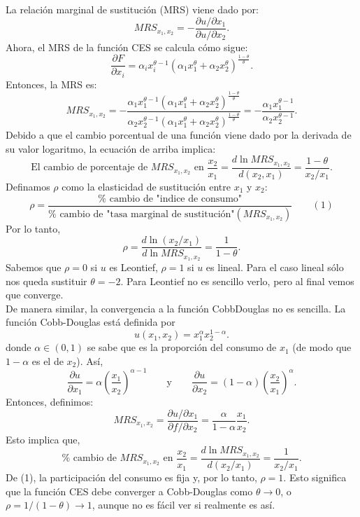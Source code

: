 \begin{enumerate}
\begin{enumerate}[\bfseries a)]
	    La relación marginal de sustitución (MRS) viene dado por:
	    $$MRS_{x_1,x_2}=-\dfrac{\partial u/\partial x_1}{\partial u/\partial x_2}.$$
	    Ahora, el MRS de la función CES se calcula cómo sigue:
	    $$\dfrac{\partial F}{\partial x_i} = \alpha_ix_i^{\theta-1}\left(\alpha_1x_1^{\theta}+\alpha_2x_2^{\theta}\right)^{\frac{1-\theta}{\theta}}.$$
	    Entonces, la MRS es:
	    $$MRS_{x_1,x_2}=-\dfrac{\alpha_1x_1^{\theta-1}\left(\alpha_1x_1^{\theta}+\alpha_2x_2^{\theta}\right)^{\frac{1-\theta}{\theta}}}{\alpha_2x_2^{\theta-1}\left(\alpha_1x_1^{\theta}+\alpha_2x_2^{\theta}\right)^{\frac{1-\theta}{\theta}}}=-\dfrac{\alpha_1x_1^{\theta-1}}{\alpha_2x_2^{\theta-1}}.$$
	    Debido a que el cambio porcentual de una función viene dado por la derivada de su valor logaritmo, la ecuación de arriba implica:
	    $$\text{El cambio de porcentaje de } MRS_{x_1,x_2} \text{ en } \dfrac{x_2}{x_1} = \dfrac{d\ln MRS_{x_1,x_2}}{d(x_2,x_1)} = \dfrac{1-\theta}{x_2/x_1}.$$
	    Definamos $\rho$ como la elasticidad de sustitución entre $x_1$ y $x_2$:
	    $$\rho = \dfrac{\% \text{ cambio de "indice de consumo"}}{\% \text{ cambio de "tasa marginal de sustitución"} (MRS_{x_1,x_2})}\qquad (1)$$
	    Por lo tanto,
	    $$\rho = \dfrac{d\ln(x_2/x_1)}{d\ln MRS_{x_1,x_2}} = \dfrac{1}{1-\theta}.$$
	    Sabemos que $\rho = 0$ si $u$ es Leontief, $\rho = 1$ si $u$ es lineal. Para el caso lineal sólo nos queda sustituir $\theta=-2$. Para Leontief no es sencillo verlo, pero al final vemos que converge.\\

	    De manera similar, la convergencia a la función CobbDouglas no es sencilla. La función Cobb-Douglas está definida por
	    $$u(x_1,x_2)=x_1^{\alpha}x_2^{1-\alpha}.$$
	    donde $\alpha\in (0,1)$ se sabe que es la proporción del consumo de $x_1$ (de modo que $1-\alpha$ es el de $x_2$). Así,
	    $$\dfrac{\partial u}{\partial x_1} = \alpha \left(\dfrac{x_1}{x_2}\right)^{\alpha-1} \qquad \text{y}\qquad \dfrac{\partial u}{\partial x_2} = (1-\alpha) \left(\dfrac{x_2}{x_1}\right)^{\alpha}.$$
	    Entonces, definimos:
	    $$MRS_{x_1,x_2} = \dfrac{\partial u / \partial x_1}{\partial f / \partial x_2} = \dfrac{\alpha}{1-\alpha} \dfrac{x_1}{x_2}.$$
	    Esto implica que,
	    $$\%\text{ cambio de } MRS_{x_1,x_2} \text{ en } \dfrac{x_2}{x_1} = \dfrac{d\ln MRS_{x_1,x_2}}{d(x_2/x_1)} = \dfrac{1}{x_2/x_1}.$$
	    De (1), la participación del consumo es fija y, por lo tanto, $\rho = 1$. Esto significa que la función CES debe converger a Cobb-Douglas como $\theta\to 0$, o $\rho = 1/(1-\theta)\to 1$, aunque no es fácil ver si realmente es así.\\
	    


\end{enumerate}
\end{enumerate}
